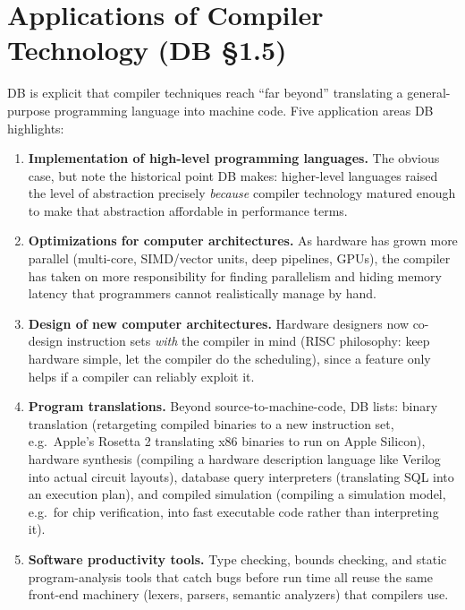 \documentclass[full-course-notes.tex]{subfiles}
\begin{document}
\section{Applications of Compiler Technology (DB \S1.5)}
\label{sec:l1-applications}

\dbtag DB is explicit that compiler techniques reach ``far beyond'' translating a
general-purpose programming language into machine code. Five application areas DB highlights:

\begin{enumerate}
  \item \textbf{Implementation of high-level programming languages.} The obvious case, but note
  the historical point DB makes: higher-level languages raised the level of abstraction
  precisely \emph{because} compiler technology matured enough to make that abstraction
  affordable in performance terms.
  \item \textbf{Optimizations for computer architectures.} As hardware has grown more parallel
  (multi-core, SIMD/vector units, deep pipelines, GPUs), the compiler has taken on more
  responsibility for finding parallelism and hiding memory latency that programmers cannot
  realistically manage by hand.
  \item \textbf{Design of new computer architectures.} Hardware designers now co-design
  instruction sets \emph{with} the compiler in mind (RISC philosophy: keep hardware simple, let
  the compiler do the scheduling), since a feature only helps if a compiler can reliably exploit
  it.
  \item \textbf{Program translations.} Beyond source-to-machine-code, DB lists: binary
  translation (retargeting compiled binaries to a new instruction set, e.g.\ Apple's Rosetta 2
  translating x86 binaries to run on Apple Silicon), hardware synthesis (compiling a hardware
  description language like Verilog into actual circuit layouts), database query interpreters
  (translating SQL into an execution plan), and compiled simulation (compiling a simulation
  model, e.g.\ for chip verification, into fast executable code rather than interpreting it).
  \item \textbf{Software productivity tools.} Type checking, bounds checking, and static
  program-analysis tools that catch bugs before run time all reuse the same front-end machinery
  (lexers, parsers, semantic analyzers) that compilers use.
\end{enumerate}
\end{document}
